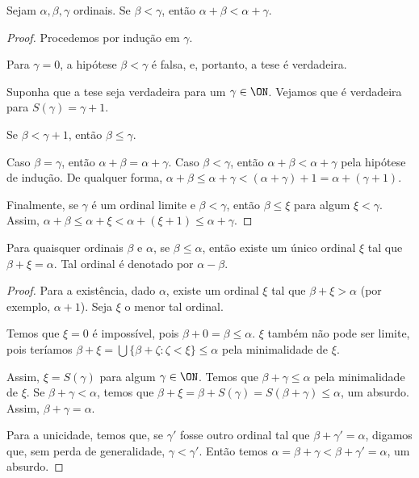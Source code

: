 \begin{lemma}\label{lem:somaOrdinalEstritamenteCrescenteNoSegundoArgumento}
    Sejam $\alpha, \beta, \gamma$ ordinais.
    Se $\beta<\gamma$, então $\alpha+\beta<\alpha+\gamma$.
\end{lemma}
\begin{proof}
    Procedemos por indução em $\gamma$.

    Para $\gamma=0$, a hipótese $\beta<\gamma$ é falsa, e, portanto, a tese é verdadeira.

    Suponha que a tese seja verdadeira para um $\gamma\in \ON$.
    Vejamos que é verdadeira para $S(\gamma)=\gamma+1$.

    Se $\beta<\gamma+1$, então $\beta\leq \gamma$.
    
    Caso $\beta=\gamma$, então $\alpha+\beta=\alpha+\gamma$.
    Caso $\beta<\gamma$, então $\alpha+\beta<\alpha+\gamma$ pela hipótese de indução.
    De qualquer forma, $\alpha+\beta\leq \alpha+\gamma<(\alpha+\gamma)+1=\alpha+(\gamma+1)$.

    Finalmente, se $\gamma$ é um ordinal limite e $\beta<\gamma$, então $\beta\leq \xi$ para algum $\xi<\gamma$.
    Assim, $\alpha+\beta\leq \alpha+\xi<\alpha+(\xi+1)\leq \alpha+\gamma$.
\end{proof}

\begin{proposition}\label{prop:subtracaoOrdinal}
    Para quaisquer ordinais $\beta$ e $\alpha$, se $\beta\leq \alpha$, então existe um único ordinal $\xi$ tal que $\beta+\xi=\alpha$.
    Tal ordinal é denotado por $\alpha-\beta$.
\end{proposition}
\begin{proof}
    Para a existência, dado $\alpha$, existe um ordinal $\xi$ tal que $\beta+\xi>\alpha$ (por exemplo, $\alpha+1$).
    Seja $\xi$ o menor tal ordinal.

    Temos que $\xi=0$ é impossível, pois $\beta+0=\beta\leq \alpha$.
    $\xi$ também não pode ser limite, pois teríamos $\beta+\xi=\bigcup\{\beta+\zeta : \zeta <\xi\}\leq \alpha$ pela minimalidade de $\xi$.

    Assim, $\xi=S(\gamma)$ para algum $\gamma\in \ON$.
    Temos que $\beta+\gamma\leq \alpha$ pela minimalidade de $\xi$.
    Se $\beta+\gamma<\alpha$, temos que $\beta+\xi=\beta+S(\gamma)=S(\beta+\gamma)\leq \alpha$, um absurdo.
    Assim, $\beta+\gamma=\alpha$.

    Para a unicidade, temos que, se $\gamma'$ fosse outro ordinal tal que $\beta+\gamma'=\alpha$, digamos que, sem perda de generalidade, $\gamma<\gamma'$.
    Então temos $\alpha=\beta+\gamma<\beta+\gamma'=\alpha$, um absurdo.
\end{proof}

